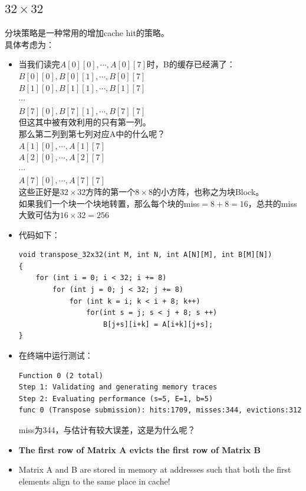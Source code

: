 \documentclass[12pt, a4paper, oneside]{ctexart}
\begin{document}
\subsection{$32\times32$}
\noindent 分块策略是一种常用的增加cache hit的策略。\\
具体考虑为：
\begin{itemize}
    \item 当我们读完$A[0][0],\cdots,A[0][7]$时，B的缓存已经满了：\\
        $B[0][0], B[0][1], \cdots, B[0][7]$\\
        $B[1][0], B[1][1], \cdots, B[1][7]$\\
        $\cdots$\\
        $B[7][0], B[7][1], \cdots, B[7][7]$\\
        但这其中被有效利用的只有第一列。\\
        那么第二列到第七列对应A中的什么呢？\\
        $A[1][0],\cdots,A[1][7]$\\
        $A[2][0],\cdots,A[2][7]$\\
        $\cdots$\\
        $A[7][0],\cdots,A[7][7]$\\
        这些正好是$32\times32$方阵的第一个$8\times8$的小方阵，也称之为块Block。\\
        如果我们一个块一个块地转置，那么每个块的miss$=8+8=16$，总共的miss大致可估为$16\times32=256$
    \item 代码如下：
\begin{lstlisting}
void transpose_32x32(int M, int N, int A[N][M], int B[M][N])
{
    for (int i = 0; i < 32; i += 8)
        for (int j = 0; j < 32; j += 8)
            for (int k = i; k < i + 8; k++)
                for(int s = j; s < j + 8; s ++)
                    B[j+s][i+k] = A[i+k][j+s];
}
\end{lstlisting}
    \item 在终端中运行测试：
\begin{lstlisting}
Function 0 (2 total)
Step 1: Validating and generating memory traces
Step 2: Evaluating performance (s=5, E=1, b=5)
func 0 (Transpose submission): hits:1709, misses:344, evictions:312
\end{lstlisting}
    miss为344，与估计有较大误差，这是为什么呢？
    \item \textbf{The first row of Matrix A evicts the first row of Matrix B}
    \item Matrix A and	B	are	stored	in	memory	at	addresses	such	that	both	
    the	first	elements	align	to	the	same	place	in	cache!

\end{itemize}
\end{document}
